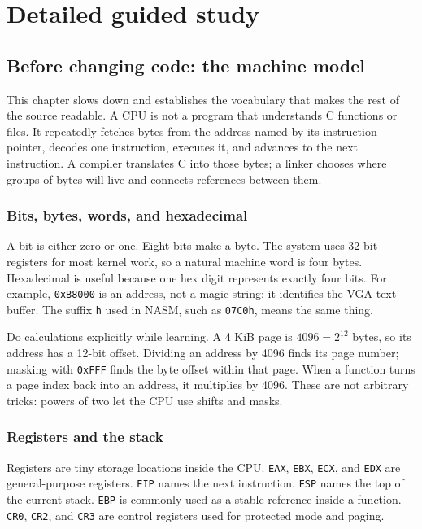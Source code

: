 \part{Detailed guided study}

\chapter{Before changing code: the machine model}
This chapter slows down and establishes the vocabulary that makes the rest of the source readable. A CPU is not a program that understands C functions or files. It repeatedly fetches bytes from the address named by its instruction pointer, decodes one instruction, executes it, and advances to the next instruction. A compiler translates C into those bytes; a linker chooses where groups of bytes will live and connects references between them.

\section{Bits, bytes, words, and hexadecimal}
A bit is either zero or one. Eight bits make a byte. The system uses 32-bit registers for most kernel work, so a natural machine word is four bytes. Hexadecimal is useful because one hex digit represents exactly four bits. For example, \texttt{0xB8000} is an address, not a magic string: it identifies the VGA text buffer. The suffix \texttt{h} used in NASM, such as \texttt{07C0h}, means the same thing.

Do calculations explicitly while learning. A 4 KiB page is \(4096 = 2^{12}\) bytes, so its address has a 12-bit offset. Dividing an address by 4096 finds its page number; masking with \texttt{0xFFF} finds the byte offset within that page. When a function turns a page index back into an address, it multiplies by 4096. These are not arbitrary tricks: powers of two let the CPU use shifts and masks.

\section{Registers and the stack}
Registers are tiny storage locations inside the CPU. \texttt{EAX}, \texttt{EBX}, \texttt{ECX}, and \texttt{EDX} are general-purpose registers. \texttt{EIP} names the next instruction. \texttt{ESP} names the top of the current stack. \texttt{EBP} is commonly used as a stable reference inside a function. \texttt{CR0}, \texttt{CR2}, and \texttt{CR3} are control registers used for protected mode and paging.

